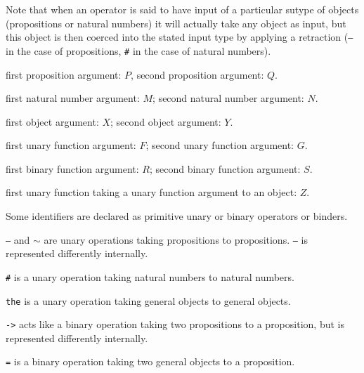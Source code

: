 \documentclass{article}
\begin{document}
{{Note that when an operator is said to have input of a particular sutype of objects (propositions or natural numbers) it will actually take any object as input, but this object is then coerced into the stated input type by applying a retraction ({\tt --} in the case of propositions, {\tt \#} in the case of natural numbers).

\begin{description}

\item first proposition argument:  $P$, second proposition argument: $Q$.

\item first natural number argument:  $M$; second natural number argument: $N$.

\item first object argument: $X$;  second object argument: $Y$.

\item first unary function argument: $F$;  second unary function argument: $G$.

\item  first binary function argument: $R$;  second binary function argument: $S$.

\item first unary function taking a unary function argument to an object: $Z$.

\end{description}

Some identifiers are declared as primitive unary or binary operators or binders.

\begin{description}

\item  {\tt --} and $\sim$ are unary operations taking propositions to propositions.  {\tt --} is represented differently internally.

\item  {\tt \#} is a unary operation taking natural numbers to natural numbers.

\item {\tt the} is a unary operation taking general objects to general objects.

\item  {\tt ->} acts like a binary operation taking two propositions to a proposition, but is represented differently internally.

\item  {\tt =} is a binary operation taking two general objects to a proposition.


\end{description}}}
\end{document}
